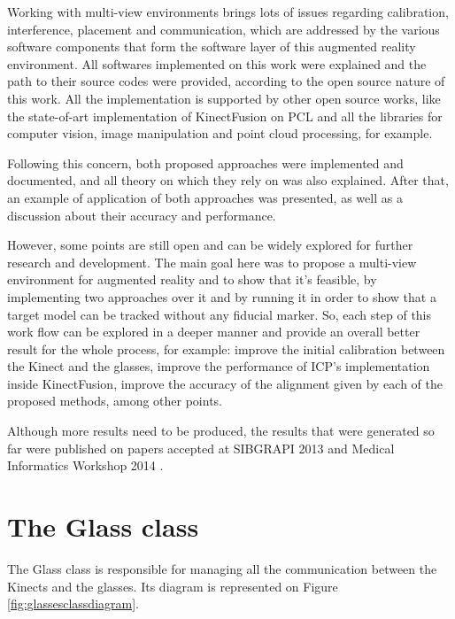 \documentclass[msc, a4paper, classic, en]{ufbathesis}
\begin{document}
Working with multi-view environments brings lots of issues regarding calibration, interference, placement and communication, which are addressed by the various software components that form the software layer of this augmented reality environment. All softwares implemented on this work were explained and the path to their source codes were provided, according to the open source nature of this work. All the implementation is supported by other open source works, like the state-of-art implementation of KinectFusion on PCL and all the libraries for computer vision, image manipulation and point cloud processing, for example.

Following this concern, both proposed approaches were implemented and documented, and all theory on which they rely on was also explained. After that, an example of application of both approaches was presented, as well as a discussion about their accuracy and performance.

However, some points are still open and can be widely explored for further research and development. The main goal here was to propose a multi-view environment for augmented reality and to show that it's feasible, by implementing two approaches over it and by running it in order to show that a target model can be tracked without any fiducial marker. So, each step of this work flow can be explored in a deeper manner and provide an overall better result for the whole process, for example: improve the initial calibration between the Kinect and the glasses, improve the performance of ICP's implementation inside KinectFusion, improve the accuracy of the alignment given by each of the proposed methods, among other points.

Although more results need to be produced, the results that were generated so far were published on papers accepted at SIBGRAPI 2013 \cite{sibgrapi} and Medical Informatics Workshop 2014 \cite{wim}.

\backmatter

\appendix
\label{appendix}

\chapter{The Glass class}

The Glass class is responsible for managing all the communication between the Kinects and the glasses. Its diagram is represented on Figure \ref{fig:glassesclassdiagram}.
\end{document}

